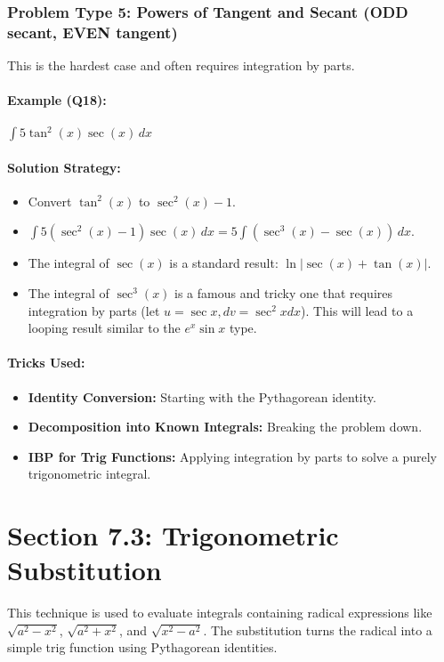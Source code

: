 \documentclass{article}
\begin{document}
\subsubsection{Problem Type 5: Powers of Tangent and Secant (ODD secant, EVEN tangent)}
This is the hardest case and often requires integration by parts.
\paragraph{Example (Q18):} $ \int 5\tan^2(x)\sec(x) \,dx $
\paragraph{Solution Strategy:}
\begin{itemize}
    \item Convert $\tan^2(x)$ to $\sec^2(x)-1$.
    \item $\int 5(\sec^2(x)-1)\sec(x) \,dx = 5\int (\sec^3(x) - \sec(x)) \,dx$.
    \item The integral of $\sec(x)$ is a standard result: $\ln|\sec(x)+\tan(x)|$.
    \item The integral of $\sec^3(x)$ is a famous and tricky one that requires integration by parts (let $u=\sec x, dv=\sec^2x dx$). This will lead to a looping result similar to the $e^x\sin x$ type.
\end{itemize}
\paragraph{Tricks Used:}
\begin{itemize}
    \item \textbf{Identity Conversion:} Starting with the Pythagorean identity.
    \item \textbf{Decomposition into Known Integrals:} Breaking the problem down.
    \item \textbf{IBP for Trig Functions:} Applying integration by parts to solve a purely trigonometric integral.
\end{itemize}

\section{Section 7.3: Trigonometric Substitution}
This technique is used to evaluate integrals containing radical expressions like $\sqrt{a^2-x^2}$, $\sqrt{a^2+x^2}$, and $\sqrt{x^2-a^2}$. The substitution turns the radical into a simple trig function using Pythagorean identities.
\end{document}
